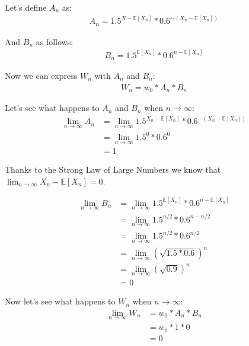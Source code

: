 \documentclass[12pt]{article}
\begin{document}
Let's define $A_n$ as:
\begin{align}
  \begin{equation*}
    A_n = 1.5^{X - \mathbb{E}[X_n]} * 0.6^{-(X_n - \mathbb{E}[X_n])}
  \end{equation*}
\end{align}

And $B_n$ as follows:
\begin{align}
  \begin{equation*}
    B_n = 1.5^{\mathbb{E}[X_n]} * 0.6^{n - \mathbb{E}[X_n]}
  \end{equation*}
\end{align}

Now we can express $W_n$ with $A_n$ and $B_n$:
\begin{align}
  \begin{equation*}
    W_n = w_0 * A_n * B_n
  \end{equation*}
\end{align}

Let's see what happens to $A_n$ and $B_n$ when $n \rightarrow \infty$:
\begin{equation*}
  \begin{split}
    \lim_{n\to\infty} A_n &= \lim_{n\to\infty} 1.5^{X_n - \mathbb{E}[X_n]} * 0.6^{-(X_n - \mathbb{E}[X_n])}\\
    &= \lim_{n\to\infty} 1.5^0 * 0.6^0 \\
    & = 1
  \end{split}
\end{equation*}

Thanks to the Strong Law of Large Numbers we know that $\lim_{n\to\infty}{X_n - \mathbb{E}[X_n]} = 0$.

\begin{equation*}
  \begin{split}
    \lim_{n\to\infty} B_n &=  \lim_{n\to\infty}1.5^{\mathbb{E}[X_n]} * 0.6^{n - \mathbb{E}[X_n]} \\
    &= \lim_{n\to\infty} 1.5^{n/2} * 0.6^{n - n/2} \\
    &= \lim_{n\to\infty} 1.5^{n/2} * 0.6^{n/2} \\
    &= \lim_{n\to\infty} (\sqrt{1.5*0.6})^{n}\\
    &= \lim_{n\to\infty} (\sqrt{0.9}) ^{n}\\
    &= 0
  \end{split}
\end{equation*}

Now let's see what happens to $W_n$ when $n \rightarrow \infty$:
\begin{equation*}
  \begin{split}
    \lim_{n\to\infty} W_n &= w_0 * A_n * B_n\\
    & = w_0 * 1 * 0 \\
    & = 0
  \end{split}
\end{equation*}
  
\end{document}
